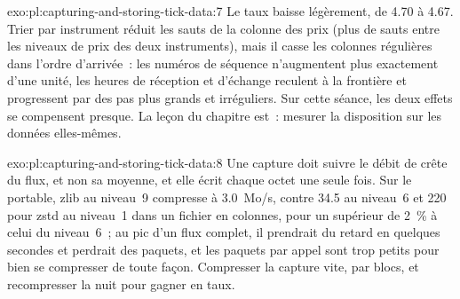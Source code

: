 \begin{solution}{exo:pl:capturing-and-storing-tick-data:7}
Le taux baisse légèrement, de 4.70 à 4.67. Trier par instrument réduit les sauts de la colonne des prix (plus de sauts entre les niveaux de prix
des deux instruments), mais il casse les colonnes régulières dans l'ordre d'arrivée~: les numéros de séquence n'augmentent plus
exactement d'une unité, les heures de réception et d'échange reculent à la frontière et progressent par des pas plus grands et irréguliers. Sur cette séance, les
deux effets se compensent presque. La leçon du chapitre est~: mesurer la disposition sur les données elles-mêmes.
\end{solution}

\begin{solution}{exo:pl:capturing-and-storing-tick-data:8}
Une capture doit suivre le débit de crête du flux, et non sa moyenne, et elle écrit chaque octet une seule fois. Sur le portable, zlib au niveau~9
compresse à 3.0~Mo/s, contre 34.5 au niveau~6 et 220 pour zstd au niveau~1 dans un fichier en colonnes, pour un  supérieur de 2~\% à celui du niveau~6~;
au pic d'un flux complet, il prendrait du retard en quelques secondes et perdrait des paquets, et les paquets par appel sont trop petits pour bien se compresser
de toute façon. Compresser la capture vite, par blocs, et recompresser la nuit pour gagner en taux.
\end{solution}

